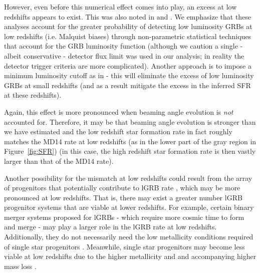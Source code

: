 \documentclass[fleqn,usenatbib,useAMS]{mnras}
\begin{document}
 However, even before this numerical effect comes into play, an excess at low redshifts appears to exist. This was also noted in \cite{PKK15, Yu15} and \cite{LR19}. We emphasize that these analyses account for the greater probability of detecting low luminosity GRBs at low redshifts (i.e. Malquist biases) through non-parametric statistical techniques that account for the GRB luminosity function (although we caution a single - albeit conservative - detector flux limit was used in our analysis; in reality the detector trigger criteria are more complicated). Another approach is to impose a minimum luminosity cutoff as in \cite{Kist08} - this will eliminate the excess of low luminosity GRBs at small redshifts (and as a result mitigate the excess in the inferred SFR at these redshifts).
 
 
 Again, this effect is more pronounced when beaming angle evolution is {\em not} accounted for.  Therefore, it may be that beaming angle evolution is stronger than we have estimated and the low redshift star formation rate in fact roughly matches the MD14 rate at low redshifts (as in the lower part of the gray region in Figure~\ref{fig:SFR}) (in this case, the high redshift star formation rate is then vastly larger than that of the MD14 rate).
 
 

 Another possibility for the mismatch at low redshifts could result from the array of progenitors that potentially contribute to lGRB rate \citep{Lev16}, which may be more pronounced at low redshifts. That is, there may exist a greater number lGRB progenitor systems that are  viable at lower redshifts.  For example, certain binary merger systems proposed for lGRBs - which require more cosmic time to form and merge - may play a larger role in the lGRB rate at low redshifts. Additionally, they do not necessarily need the low metallicity conditions required of single star progenitors \citep{MT20, Hao20}.  Meanwhile, single star progenitors may become less viable at low redshifts due to the higher metallicity and and accompanying higher mass loss  \citep{Chr20,PW20,Klen20, MT20}.
 
\end{document}
